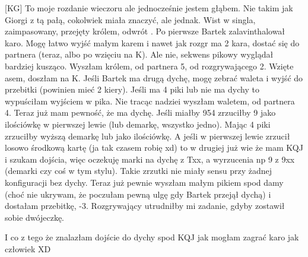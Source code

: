 \documentclass[12pt, a4paper]{article}
\begin{document}
[KG] To moje rozdanie wieczoru ale jednocześnie jestem głąbem.
Nie takim jak Giorgi z tą pałą, cokolwiek miała
znaczyć, ale jednak. Wist w singla, zaimpasowany, przejęty królem,
odwrót . Po pierwsze Bartek zalavinthalował karo. Mogę łatwo wyjść
małym karem i nawet jak rozgr ma 2 kara, dostać się do partnera (teraz, albo po wzięciu na
\xhearts K). Ale nie, sekwens pikowy wyglądał bardziej kusząco. Wyszłam królem,
od partnera 5, od rozgrywającego 2. Wzięte asem, doszłam na \xhearts K. Jeśli
Bartek ma drugą dychę, mogę zebrać waleta i wyjść do przebitki (powinien mieć 2 kiery).
Jeśli ma 4 piki lub nie ma dychy to wypuściłam wyjściem w pika. Nie tracąc
nadziei wyszłam waletem, od partnera 4. Teraz już mam pewność, że ma dychę.
Jeśli miałby 954 zrzuciłby 9 jako ilościówkę w pierwszej lewie (lub demarkę, wszystko jedno).
Mając 4 piki zrzuciłby wyższą demarkę lub  jako ilościówkę. 
A jeśli w pierwszej lewie zrzucił losowo środkową kartę (ja tak czasem robię xd)
to w drugiej już wie że mam KQJ i szukam dojścia, więc oczekuję marki na dychę z Txx,
a wyrzucenia np 9 z 9xx (demarki czy coś w tym stylu).
Takie zrzutki nie miały
sensu przy żadnej konfiguracji bez dychy. Teraz już pewnie wyszłam małym pikiem spod damy
(choć nie ukrywam, że poczułam pewną ulgę gdy Bartek przejął dychą) 
i dostałam przebitkę, -3.
Rozgrywający utrudniłby mi zadanie, gdyby zostawił sobie dwójeczkę.

I co z tego że znalazłam dojście do dychy spod KQJ jak mogłam zagrać
karo jak człowiek XD
\end{document}
